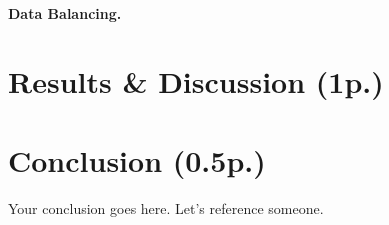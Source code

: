 \documentclass[11pt]{article}
\begin{document}
\paragraph{Data Balancing.}

\section{Results \& Discussion (1p.)}

\section{Conclusion (0.5p.)}



Your conclusion goes here. Let's reference someone.



\end{document}
